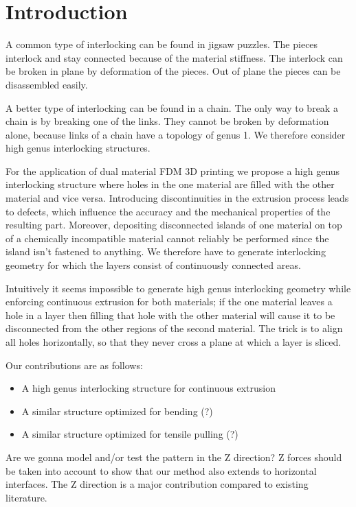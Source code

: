 \section{Introduction}


A common type of interlocking can be found in jigsaw puzzles.
The pieces interlock and stay connected because of the material stiffness.
The interlock can be broken in plane by deformation of the pieces.
Out of plane the pieces can be disassembled easily.

A better type of interlocking can be found in a chain.
The only way to break a chain is by breaking one of the links.
They cannot be broken by deformation alone, because links of a chain have a topology of genus 1.
We therefore consider high genus interlocking structures.

For the application of dual material FDM 3D printing we propose a high genus interlocking structure where holes in the one material are filled with the other material and vice versa.
Introducing discontinuities in the extrusion process leads to defects, which influence the accuracy and the mechanical properties of the resulting part.
Moreover, depositing disconnected islands of one material on top of a chemically incompatible material cannot reliably be performed since the island isn't fastened to anything.
We therefore have to generate interlocking geometry for which the layers consist of continuously connected areas.

Intuitively it seems impossible to generate high genus interlocking geometry while enforcing continuous extrusion for both materials;
if the one material leaves a hole in a layer then filling that hole with the other material will cause it to be disconnected from the other regions of the second material.
The trick is to align all holes horizontally, so that they never cross a plane at which a layer is sliced.



Our contributions are as follows:
\begin{itemize}
	\item A high genus interlocking structure for continuous extrusion
	\item A similar structure optimized for bending (?)
	\item A similar structure optimized for tensile pulling (?)
\end{itemize}

Are we gonna model and/or test the pattern in the Z direction?
Z forces should be taken into account to show that our method also extends to horizontal interfaces.
The Z direction is a major contribution compared to existing literature.

